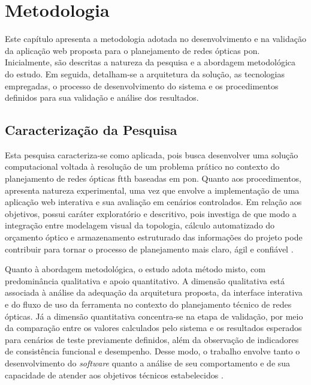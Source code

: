\chapter{Metodologia}

Este capítulo apresenta a metodologia adotada no desenvolvimento e na validação da aplicação web proposta para o planejamento de redes ópticas \gls{pon}. Inicialmente, são descritas a natureza da pesquisa e a abordagem metodológica do estudo. Em seguida, detalham-se a arquitetura da solução, as tecnologias empregadas, o processo de desenvolvimento do sistema e os procedimentos definidos para sua validação e análise dos resultados.

\section{Caracterização da Pesquisa}

Esta pesquisa caracteriza-se como aplicada, pois busca desenvolver uma solução computacional voltada à resolução de um problema prático no contexto do planejamento de redes ópticas \gls{ftth} baseadas em \gls{pon}. Quanto aos procedimentos, apresenta natureza experimental, uma vez que envolve a implementação de uma aplicação web interativa e sua avaliação em cenários controlados. Em relação aos objetivos, possui caráter exploratório e descritivo, pois investiga de que modo a integração entre modelagem visual da topologia, cálculo automatizado do orçamento óptico e armazenamento estruturado das informações do projeto pode contribuir para tornar o processo de planejamento mais claro, ágil e confiável \cite{gil2008metodos,prodanov2013metodologia}.

Quanto à abordagem metodológica, o estudo adota método misto, com predominância qualitativa e apoio quantitativo. A dimensão qualitativa está associada à análise da adequação da arquitetura proposta, da interface interativa e do fluxo de uso da ferramenta no contexto do planejamento técnico de redes ópticas. Já a dimensão quantitativa concentra-se na etapa de validação, por meio da comparação entre os valores calculados pelo sistema e os resultados esperados para cenários de teste previamente definidos, além da observação de indicadores de consistência funcional e desempenho. Desse modo, o trabalho envolve tanto o desenvolvimento do \textit{software} quanto a análise de seu comportamento e de sua capacidade de atender aos objetivos técnicos estabelecidos \cite{creswell2014research}.

